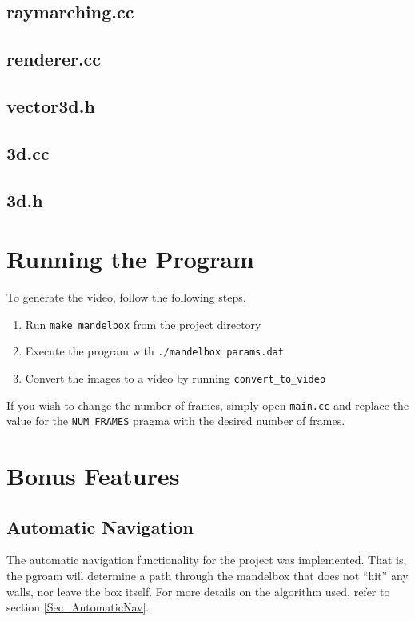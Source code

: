 \documentclass[11pt]{article}
\begin{document}
\subsection{raymarching.cc}


\subsection{renderer.cc}


\subsection{vector3d.h}


\subsection{3d.cc}


\subsection{3d.h}


\section{Running the Program}
To generate the video, follow the following steps.
\begin{enumerate}
\item Run \texttt{make mandelbox} from the project directory
\item Execute the program with \texttt{./mandelbox params.dat}
\item Convert the images to a video by running \texttt{convert\_to\_video}
\end{enumerate}

If you wish to change the number of frames, simply open \texttt{main.cc} and replace the value for the \texttt{NUM\_FRAMES} pragma with the desired number of frames.

\section{Bonus Features}
\subsection{Automatic Navigation}
The automatic navigation functionality for the project was implemented. That is, the pgroam will determine a path through the mandelbox that does not ``hit'' any walls, nor leave the box itself. For more details on the algorithm used, refer to section \ref{Sec_AutomaticNav}.
\end{document}
